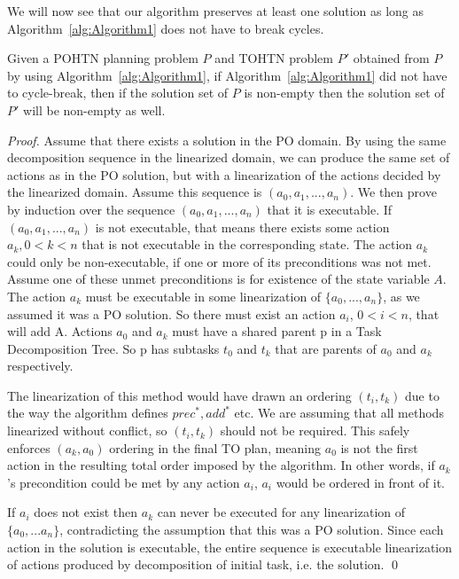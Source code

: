 \documentclass[runningheads]{llncs}
\begin{document}
We will now see that our algorithm preserves at least one solution as long as Algorithm~\ref{alg:Algorithm1} does not have to break cycles.
\begin{theorem}\label{thm:SpecialCase}
	Given a POHTN planning problem $P$ and TOHTN problem
	$P'$ obtained from $P$ by using Algorithm~\ref{alg:Algorithm1}, if Algorithm~\ref{alg:Algorithm1} did not have to
	cycle-break, then if the solution set of $P$ is non-empty then the solution set of $P'$ will be non-empty as well.
\end{theorem}
\begin{proof}
	Assume that there exists a solution in the PO domain. By using the same decomposition sequence in the linearized domain, we can produce the same set of actions as in the PO solution, but with a linearization of the actions decided by the linearized domain. Assume this sequence is $(a_0, a_1, ..., a_n)$. We then prove by induction over the sequence $(a_0, a_1, ..., a_n)$ that it is executable.
	If $(a_0, a_1, ..., a_n)$ is not executable, that means there exists some action $a_k,  0 < k < n$ that is not executable in the corresponding state. The action $a_k$ could only be non-executable, if one or more of its preconditions was not met. Assume one of these unmet preconditions is for existence of the state variable $A$.
	The action $a_k$ must be executable in some linearization of $\{a_0, ..., a_n\}$, as we assumed it was a PO solution. So there must exist an action $a_i$, $0 < i < n$, that will add A. Actions $a_0$ and $a_k$ must have a shared parent p in a Task Decomposition Tree. So p has subtasks $t_0$ and $t_k$ that are parents of $a_0$ and $a_k$ respectively. 
	
	The linearization of this method would have drawn an ordering $(t_i, t_k)$ due to the way the algorithm defines $prec^{*}, add^{*}$ etc. We are assuming that all methods linearized without conflict, so $(t_i, t_k)$ should not be required. This safely enforces $(a_k, a_0)$ ordering in the final TO plan, meaning $a_0$ is not the first action in the resulting total order imposed by the algorithm. In other words, if $a_k$’s precondition could be met by any action $a_i$, $a_i$ would be ordered in front of it. 
	
	If $a_i$ does not exist then $a_k$ can never be executed for any linearization of $\{a_0, ...a_n\}$, contradicting the assumption that this was a PO solution. Since each action in the solution is executable, the entire sequence is executable linearization of actions produced by decomposition of initial task, i.e. the solution.
	\qed
\end{proof}
 
\end{document}
